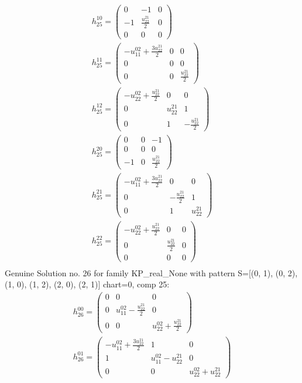 \documentclass[a4paper, 11pt, twoside, onecolumn]{article}
\begin{document}
\begin{landscape}
\begin{gather*}
	 h_{25}^{10}=\begin{pmatrix}0 & -1 & 0\\-1 & \frac{u^{21}_{22}}{2} & 0\\0 & 0 & 0\end{pmatrix}\\ 
	 h_{25}^{11}=\begin{pmatrix}- u^{02}_{11} + \frac{3 u^{21}_{22}}{2} & 0 & 0\\0 & 0 & 0\\0 & 0 & \frac{u^{21}_{22}}{2}\end{pmatrix}\\ 
	 h_{25}^{12}=\begin{pmatrix}- u^{02}_{22} + \frac{u^{21}_{22}}{2} & 0 & 0\\0 & u^{21}_{22} & 1\\0 & 1 & - \frac{u^{21}_{22}}{2}\end{pmatrix}\\ 
	 h_{25}^{20}=\begin{pmatrix}0 & 0 & -1\\0 & 0 & 0\\-1 & 0 & \frac{u^{21}_{22}}{2}\end{pmatrix}\\ 
	 h_{25}^{21}=\begin{pmatrix}- u^{02}_{11} + \frac{3 u^{21}_{22}}{2} & 0 & 0\\0 & - \frac{u^{21}_{22}}{2} & 1\\0 & 1 & u^{21}_{22}\end{pmatrix}\\ 
	 h_{25}^{22}=\begin{pmatrix}- u^{02}_{22} + \frac{u^{21}_{22}}{2} & 0 & 0\\0 & \frac{u^{21}_{22}}{2} & 0\\0 & 0 & 0\end{pmatrix}\\ 
\end{gather*} 
Genuine Solution no. 26 for family KP_real_None with pattern S=[(0, 1), (0, 2), (1, 0), (1, 2), (2, 0), (2, 1)] chart=0, comp 25: 
\begin{gather*} 
	 h_{26}^{00}=\begin{pmatrix}0 & 0 & 0\\0 & u^{02}_{11} - \frac{u^{21}_{22}}{2} & 0\\0 & 0 & u^{02}_{22} + \frac{u^{21}_{22}}{2}\end{pmatrix}\\ 
	 h_{26}^{01}=\begin{pmatrix}- u^{02}_{11} + \frac{3 u^{21}_{22}}{2} & 1 & 0\\1 & u^{02}_{11} - u^{21}_{22} & 0\\0 & 0 & u^{02}_{22} + u^{21}_{22}\end{pmatrix}\\ 

\end{gather*}
\end{landscape}
\end{document}
